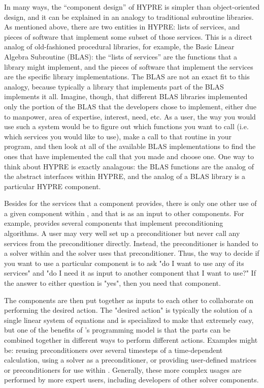 In many ways, the ``component design'' of HYPRE is simpler than object-oriented
design, and it can be explained in an analogy to traditional subroutine
libraries.
As mentioned above, there are two entities in HYPRE: lists of services, and
pieces of software that implement some subset of those services.
This is a direct analog of old-fashioned procedural libraries, for example,
the Basic Linear Algebra Subroutine (BLAS): the ``lists of
services'' are the functions that a library might implement, and the pieces
of software that implement the services are the specific library implementations.
The BLAS are not an exact fit to this analogy, because typically a library
that implements part of the BLAS implements it all.
Imagine, though, that different BLAS libraries implemented only the portion
of the BLAS that the developers chose to implement, either due to manpower,
area of expertise, interest, need, etc.
As a user, the way you would use such a system would be to figure out which
functions you want to call (i.e. which services you would like to use), make
a call to that routine in your program, and then look at all of the available
BLAS implementations to find the ones that have implemented the call that you
made and choose one.
One way to think about HYPRE is exactly analagous: the BLAS functions are 
the analog of the abstract interfaces within HYPRE, and the analog of a BLAS
library is a particular HYPRE component.

Besides for the services that a component provides, there is only one other use
of a given component within 
\hypre{}, and that is as an input to other components. For example, \hypre{} provides
several components 
that implement preconditioning algorithms. A user may very well set up a
preconditioner but never call any 
services from the preconditioner directly. Instead, the preconditioner is
handed to a solver within \hypre{} 
and the solver uses that preconditioner. Thus, the way to decide if you want to
use a particular component 
is to ask "do I want to use any of its services" and "do I need it as input to
another component that I want to 
use?" If the answer to either question is "yes", then you need that component.

The components are then put together as inputs to each other to collaborate on
performing the desired 
action. The "desired action" is typically the solution of a single linear
system of equations and \hypre{} is 
specialized to make that extremely easy, but one of the benefits of \hypre{}'s
programming model is that 
the parts can be combined together in different ways to perform different
actions. Examples might be: 
reusing preconditioners over several timesteps of a time-dependent calculation,
using a solver as a 
preconditioner, or providing user-defined matrices or preconditioners for use
within \hypre{}. Generally, 
these more complex usages are performed by more expert users, including
developers of other solver 
components.


